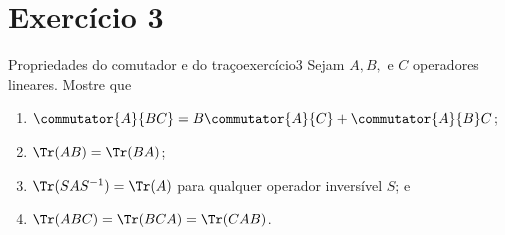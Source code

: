 \section*{Exercício 3}
\begin{exercício}{Propriedades do comutador e do traço}{exercício3}
    Sejam \(A, B,\) e \(C\) operadores lineares. Mostre que
    \begin{enumerate}[label=(\alph*)]
        \item \(\commutator{A}{BC} = B\commutator{A}{C} + \commutator{A}{B}C\);
        \item \(\Tr(AB) = \Tr(BA)\);
        \item \(\Tr(S A S^{-1}) = \Tr(A)\) para qualquer operador inversível \(S\); e
        \item \(\Tr(ABC) = \Tr(BCA) = \Tr(CAB)\).
    \end{enumerate}
\end{exercício}
